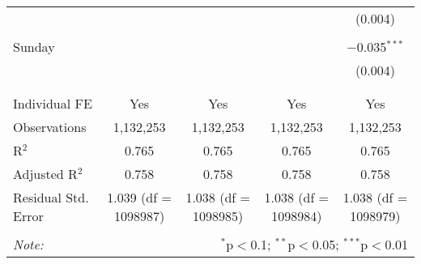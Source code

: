 \documentclass[
]{article}
\begin{document}
\begin{table}[!htbp]
{\begin{tabular}{@{\extracolsep{5pt}}lcccc}
  &  &  &  & (0.004) \\ 
  & & & & \\ 
 Sunday &  &  &  & $-$0.035$^{***}$ \\ 
  &  &  &  & (0.004) \\ 
  & & & & \\ 
\hline \\[-1.8ex] 
Individual FE & Yes & Yes & Yes & Yes \\ 
Observations & 1,132,253 & 1,132,253 & 1,132,253 & 1,132,253 \\ 
R$^{2}$ & 0.765 & 0.765 & 0.765 & 0.765 \\ 
Adjusted R$^{2}$ & 0.758 & 0.758 & 0.758 & 0.758 \\ 
Residual Std. Error & 1.039 (df = 1098987) & 1.038 (df = 1098985) & 1.038 (df = 1098984) & 1.038 (df = 1098979) \\ 
\hline 
\hline \\[-1.8ex] 
\textit{Note:}  & \multicolumn{4}{r}{$^{*}$p$<$0.1; $^{**}$p$<$0.05; $^{***}$p$<$0.01} \\ 
\end{tabular}
} 
\end{table} 
\newpage
\end{document}
